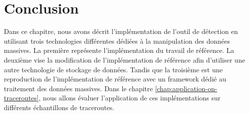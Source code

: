 \section{Conclusion}

Dans ce chapitre, nous avons décrit l'implémentation de l'outil de détection en utilisant trois technologies différentes dédiées à la manipulation des données massives.  La première représente l'implémentation du travail de référence. La deuxième  vise la modification de l'implémentation de référence afin d'utiliser une autre technologie de stockage de données. Tandis que la troisième est une reproduction de l'implémentation de référence avec un framework dédié au traitement des données massives.
Dans  le chapitre \ref{chap:application-on-traceroutes}, nous allons évaluer l'application de ces implémentations sur différents échantillons de traceroutes.
